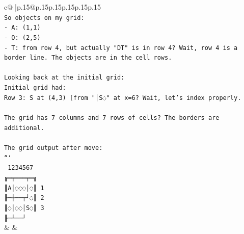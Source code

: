 \documentclass{article}
\begin{document}
{\begin{supertabular}{c@{$\;$}|p{.15\linewidth}@{}p{.15\linewidth}p{.15\linewidth}p{.15\linewidth}p{.15\linewidth}p{.15\linewidth}}
{{{\\ 
\texttt{So objects on my grid:} \\
\texttt{{-} A: (1,1)} \\
\texttt{{-} O: (2,5)} \\
\texttt{{-} T: from row 4, but actually "DT" is in row 4? Wait, row 4 is a border line. The objects are in the cell rows.} \\
\\ 
\texttt{Looking back at the initial grid:} \\
\texttt{Initial grid had:} \\
\texttt{Row 3: S at (4,3) {[}from "│S◌" at x=6? Wait, let's index properly.} \\
\\ 
\texttt{The grid has 7 columns and 7 rows of cells? The borders are additional.} \\
\\ 
\texttt{The grid output after move:} \\
\texttt{```} \\
\texttt{ 1234567} \\
\texttt{╔═╤═══╤═╗} \\
\texttt{║A│◌◌◌│◌║ 1} \\
\texttt{╟─┼──┬┘◌║ 2} \\
\texttt{║◌│◌◌│S◌║ 3} \\
\texttt{╟─┴──┘} \\
            }
        }
    }
    & & \\ \\


\end{supertabular}}
\end{document}
